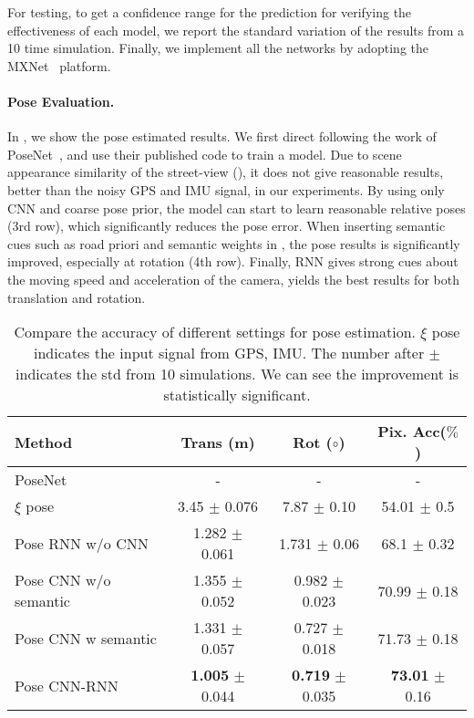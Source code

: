 For testing, to get a confidence range for the prediction for verifying the effectiveness of each model, we report the standard variation of the results from a 10 time simulation. Finally, we implement all the networks by adopting the MXNet~\cite{ChenLLLWWXXZZ15} platform.


\paragraph{Pose Evaluation.}
In , we show the pose estimated results. We first direct following the work of PoseNet~\cite{Kendall_2015_ICCV,kendall2017geometric}, and use their published code to train a model. Due to scene appearance similarity of the street-view (), it does not give reasonable results, \ie better than the noisy GPS and IMU signal, in our experiments.
By using only CNN and coarse pose prior, the model can start to learn reasonable relative poses (3rd row), which significantly reduces the pose error. When inserting semantic cues such as road priori and semantic weights in , the pose results is significantly improved, especially at rotation (4th row).
Finally, RNN gives strong cues about the moving speed and acceleration of the camera, yields the best results for both translation and rotation.

\begin{table}
\center
\fontsize{8}{9}\selectfont
\begin{tabular}{lccc}
\toprule[0.1 em]
Method & Trans (m) & Rot ($\circ$) & Pix. Acc($\%$)\\
\hline
PoseNet~\cite{kendall2017geometric} & -  & -  & -  \\
$\xi$ pose & 3.45 $\pm$ 0.076 & 7.87 $\pm$ 0.10 & 54.01 $\pm$ 0.5 \\
Pose RNN w/o CNN & 1.282 $\pm$ 0.061  & 1.731 $\pm$ 0.06 &  68.1 $\pm$ 0.32 \\
Pose CNN w/o semantic & 1.355 $\pm$ 0.052  & 0.982 $\pm$ 0.023 & 70.99 $\pm$ 0.18 \\
Pose CNN w semantic & 1.331 $\pm$ 0.057  & 0.727 $\pm$ 0.018 & 71.73 $\pm$ 0.18  \\
Pose CNN-RNN  & \textbf{1.005} $\pm$ 0.044  & \textbf{0.719} $\pm$ 0.035  & \textbf{73.01} $\pm$ 0.16  \\
\toprule[0.1 em]
\end{tabular}
\caption{Compare the accuracy of different settings for pose estimation.
$\xi$ pose indicates the input signal from GPS, IMU.
The number after $\pm$ indicates the std from 10 simulations. We can see the improvement is statistically significant.}
\label{tbl:pose}
\vspace{-0.3\baselineskip}
\end{table}

